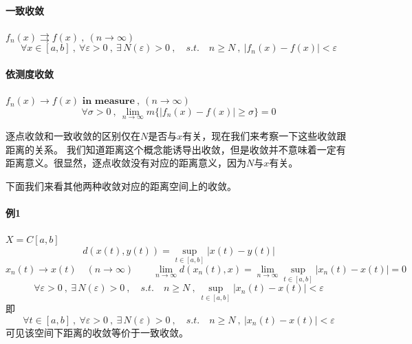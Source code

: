 \paragraph*{一致收敛} \quad $f_n(x) \rightrightarrows f(x) \ , \ (n \rightarrow \infty)$
\[\forall x \in [a,b] \ , \ \forall \varepsilon>0 \ , \ \exists \, N(\varepsilon)>0 \ , \quad s.t. \quad n \geq N \ , \ |f_n(x)-f(x)|<\varepsilon\]

\paragraph*{依测度收敛} \quad $f_n(x) \rightarrow f(x)\textbf{ in measure} \ , \ (n \rightarrow \infty)$
\[\forall \sigma>0 \ , \ \lim_{n \rightarrow \infty}m\{|f_n(x)-f(x)| \geq \sigma\}=0\]

逐点收敛和一致收敛的区别仅在$N$是否与$x$有关，现在我们来考察一下这些收敛跟距离的关系。
我们知道距离这个概念能诱导出收敛，但是收敛并不意味着一定有距离意义。很显然，逐点收敛没有对应的距离意义，因为$N$与$x$有关。

下面我们来看其他两种收敛对应的距离空间上的收敛。

\paragraph*{例1} \quad $X=C[a,b]$
\[d(x(t),y(t))=\mathop {\text{sup}}\limits_{t \in [a,b]}|x(t)-y(t)|\]
\[x_n(t) \rightarrow x(t) \quad (n \rightarrow \infty) \qquad \lim_{n \rightarrow \infty}d(x_n(t),x)=\lim_{n \rightarrow \infty}\mathop {\text{sup}}\limits_{t \in [a,b]}|x_n(t)-x(t)|=0\]
\[\forall \varepsilon>0 \ , \ \exists \, N(\varepsilon)>0 \ , \quad s.t. \quad n \geq N \ , \ \mathop {\text{sup}}\limits_{t \in [a,b]}|x_n(t)-x(t)|<\varepsilon\]
即
\[\forall t \in [a,b] \ , \ \forall \varepsilon>0 \ , \ \exists \, N(\varepsilon)>0 \ , \quad s.t. \quad n \geq N \ , \ |x_n(t)-x(t)|<\varepsilon\]
可见该空间下距离的收敛等价于一致收敛。


